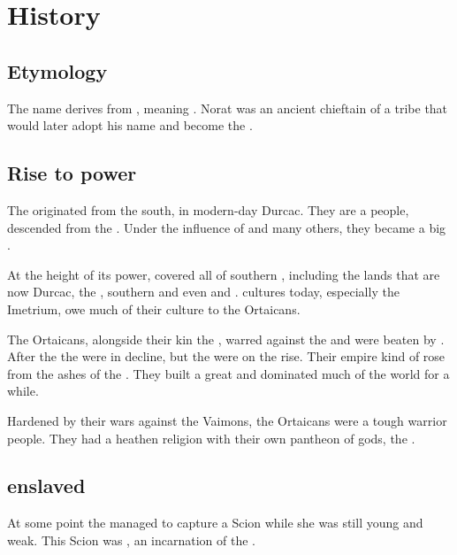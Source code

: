 \section{History}
\subsection{Etymology}
The name \quo{\Ortaican} derives from , meaning . 
Norat was an ancient chieftain of a \Mastheno{} tribe that would later adopt his name and become the \Ortaicans. 





\subsection{Rise to power}
The \Ortaicans{} originated from the south, in modern-day Durcac. 
They are a \Tassian{} people, descended from the \Masthenon. 
Under the influence of  and many others, they became a big \bacconate. 

At the height of its power, \Ortaica{} covered all of southern , including the lands that are now {Durcac}, the , southern  and even  and . 
\Scathaese{} cultures today, especially the Imetrium, owe much of their culture to the Ortaicans. 

The Ortaicans, alongside their kin the \Shurcos, warred against the  and were beaten by . 
After the  the \Shurco{} were in decline, but the \Ortaicans{} were on the rise. 
Their empire kind of rose from the ashes of the \Shurco. 
They built a great  and dominated much of the world for a while. 

Hardened by their wars against the Vaimons, the Ortaicans were a tough warrior people. 
They had a heathen religion with their own pantheon of gods, the .  





\subsection{\Ishicah{} enslaved}
At some point the \rethyaxes{} managed to capture a Scion while she was still young and weak. 
This Scion was , an incarnation of the \Malach{} . 

